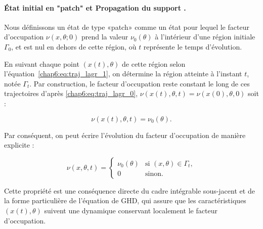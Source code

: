 

\medskip

\paragraph{État initial en "patch" et Propagation du support .}
Nous définissons un état de type «patch» comme un état pour lequel le facteur d’occupation \(\nu(x,\theta;0)\) prend la valeur \(\nu_0(\theta)\) à l’intérieur d’une région initiale \(\Gamma_0\), et est nul en dehors de cette région, où \(t\) représente le temps d’évolution.

\medskip

En suivant chaque point $(x(t),\theta)$ de cette région selon l’équation~\eqref{chap6:eq:traj_lagr_1}, on détermine la région atteinte à l’instant $t$, notée $\Gamma_t$. Par construction, le facteur d’occupation reste constant le long de ces trajectoires d'après \eqref{chap6:eq:traj_lagr_0}, $\nu(x(t),\theta,t) = \nu(x(0),\theta,0)$  soit :

\begin{equation}
	\nu(x(t),\theta,t)  = \nu_0(\theta).
\end{equation}

Par conséquent, on peut écrire l’évolution du facteur d’occupation de manière explicite :

\begin{equation}
\label{eq:contour_support}
\nu(x, \theta, t) =
\begin{cases}
\nu_0(\theta) & \text{si } (x,\theta) \in \Gamma_t, \\
0 & \text{sinon}.
\end{cases}
\end{equation}

Cette propriété est une conséquence directe du cadre intégrable sous-jacent et de la forme particulière de l’équation de \gls*{GHD}, qui assure que les caractéristiques $(x(t),\theta)$ suivent une dynamique conservant localement le facteur d’occupation.

\medskip

